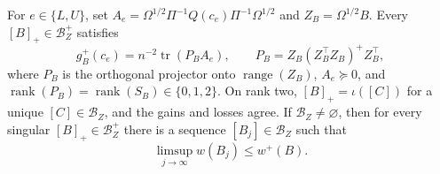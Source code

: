 For \(e\in\{L,U\}\), set \(A_e=\Omega^{1/2}\Pi^{-1}Q(c_e)\Pi^{-1}\Omega^{1/2}\) and \(Z_B=\Omega^{1/2}B\).  Every \([B]_+\in\mathcal B_Z^+\) satisfies
\[
 g_B^+(c_e)=n^{-2}\operatorname{tr}(P_BA_e),
 \qquad P_B=Z_B(Z_B^{\top}Z_B)^+Z_B^{\top},
\]
where \(P_B\) is the orthogonal projector onto \(\operatorname{range}(Z_B)\), \(A_e\succeq0\), and \(\operatorname{rank}(P_B)=\operatorname{rank}(S_B)\in\{0,1,2\}\).  On rank two, \([B]_+=\iota([C])\) for a unique \([C]\in\mathcal B_Z\), and the gains and losses agree.  If \(\mathcal B_Z\ne\varnothing\), then for every singular \([B]_+\in\mathcal B_Z^+\) there is a sequence \([B_j]\in\mathcal B_Z\) such that
\[
 \limsup_{j\to\infty}w(B_j)\le w^+(B).
\]